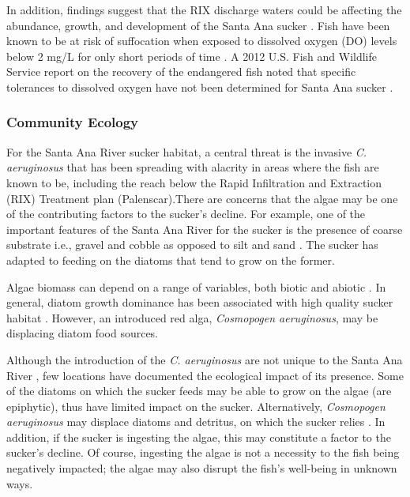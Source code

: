 \documentclass{article}\usepackage[]{graphicx}\usepackage[]{color}
\begin{document}
In addition, findings suggest that the RIX discharge waters could be affecting the abundance, growth, and development of the Santa Ana sucker \citep{jenkins2009effects}. Fish have been known to be at risk of suffocation when exposed to dissolved oxygen (DO) levels below 2 mg/L for only short periods of time \citep{REF}. A 2012 U.S. Fish and Wildlife Service report on the recovery of the endangered fish noted that specific tolerances to dissolved oxygen have not been determined for  Santa Ana sucker \citep{evans2005draft}.

\subsubsection{Community Ecology}

For the Santa Ana River sucker habitat, a central threat is the invasive \emph{C. aeruginosus} that has been spreading with alacrity in areas where the fish are known to be, including the reach below the Rapid Infiltration and Extraction (RIX) Treatment plan (Palenscar)\citep{palenscar}.There are concerns that the algae may be one of the contributing factors to the sucker's decline. For example, one of the important features of the Santa Ana River for the sucker is the presence of coarse substrate i.e., gravel and cobble as opposed to silt and sand \citep{thompson2010influence}. The sucker has adapted to feeding on the diatoms that tend to grow on the former. 

Algae biomass can depend on a range of variables, both biotic and abiotic \citep{winkelmann2014top}. In general, diatom growth dominance has been associated with high quality sucker habitat \citep{REF}. However, an introduced red alga, \emph{Cosmopogen aeruginosus}, may be displacing diatom food sources. 

Although the introduction of the \emph{C. aeruginosus} are not unique to the Santa Ana River \citep{vzakova2013new}, few locations have documented the ecological impact of its presence. Some of the diatoms on which the sucker feeds may be able to grow on the algae (are epiphytic), thus have limited impact on the sucker. Alternatively, \emph{Cosmopogen aeruginosus} may displace diatoms and detritus, on which the sucker relies \citep{thompson2010influence}. In addition, if the sucker is ingesting the algae, this may constitute a factor to the sucker's decline. Of course, ingesting the algae is not a necessity to the fish being negatively impacted; the algae may also disrupt the fish's well-being in unknown ways. 
\end{document}
